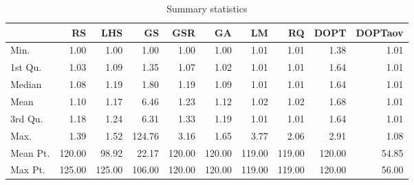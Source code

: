 \documentclass[final,12pt,a4paper]{article}
\begin{document}
\begin{table}[ht]
\centering
\begingroup\small
\begin{tabular}{lrrrrrrrrr}
  \hline
 & RS & LHS & GS & GSR & GA & LM & RQ & DOPT & DOPTaov \\ 
  \hline
Min. & 1.00 & 1.00 & 1.00 & 1.00 & 1.00 & 1.01 & 1.01 & 1.38 & 1.01 \\ 
  1st Qu. & 1.03 & 1.09 & 1.35 & 1.07 & 1.02 & 1.01 & 1.01 & 1.64 & 1.01 \\ 
  Median & 1.08 & 1.19 & 1.80 & 1.19 & 1.09 & 1.01 & 1.01 & 1.64 & 1.01 \\ 
  Mean & 1.10 & 1.17 & 6.46 & 1.23 & 1.12 & 1.02 & 1.02 & 1.68 & 1.01 \\ 
  3rd Qu. & 1.18 & 1.24 & 6.31 & 1.33 & 1.19 & 1.01 & 1.01 & 1.64 & 1.01 \\ 
  Max. & 1.39 & 1.52 & 124.76 & 3.16 & 1.65 & 3.77 & 2.06 & 2.91 & 1.08 \\ 
  Mean Pt. & 120.00 & 98.92 & 22.17 & 120.00 & 120.00 & 119.00 & 119.00 & 120.00 & 54.85 \\ 
  Max Pt. & 125.00 & 125.00 & 106.00 & 120.00 & 120.00 & 119.00 & 119.00 & 120.00 & 56.00 \\ 
   \hline
\end{tabular}
\endgroup
\caption{Summary statistics} 
\end{table}
\end{document}
